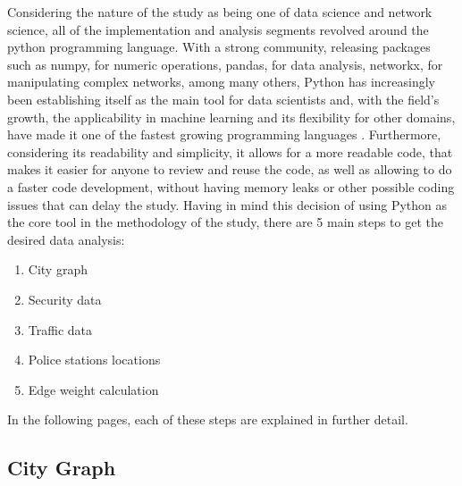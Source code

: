 \documentclass[runningheads]{llncs}
\begin{document}
Considering the nature of the study as being one of data science and network science, all of the implementation and analysis segments revolved around the python programming language. With a strong community, releasing packages such as numpy, for numeric operations, pandas, for data analysis, networkx, for manipulating complex networks, among many others, Python has increasingly been establishing itself as the main tool for data scientists and, with the field's growth, the applicability in machine learning and its flexibility for other domains, have made it one of the fastest growing programming languages \cite{robinson_why_2017}. Furthermore, considering its readability and simplicity, it allows for a more readable code, that makes it easier for anyone to review and reuse the code, as well as allowing to do a faster code development, without having memory leaks or other possible coding issues that can delay the study. Having in mind this decision of using Python as the core tool in the methodology of the study, there are 5 main steps to get the desired data analysis:

\begin{enumerate}
	\item City graph
    
    \item Security data
    
    \item Traffic data
    
    \item Police stations locations
    
    \item Edge weight calculation
\end{enumerate}

In the following pages, each of these steps are explained in further detail.

\subsection{City Graph}
\end{document}
